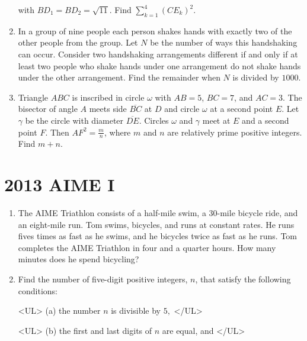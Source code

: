 \documentclass{article}
\begin{document}
\begin{enumerate}[label=\arabic*., itemsep=0.5em]
with $BD_1 = BD_2 = \sqrt{11}$. Find $\sum_{k=1}^4(CE_k)^2$.\par \vspace{0.5em}\item In a group of nine people each person shakes hands with exactly two of the other people from the group. Let $N$ be the number of ways this handshaking can occur. Consider two handshaking arrangements different if and only if at least two people who shake hands under one arrangement do not shake hands under the other arrangement. Find the remainder when $N$ is divided by $1000$.\par \vspace{0.5em}\item Triangle $ABC$ is inscribed in circle $\omega$ with $AB=5$, $BC=7$, and $AC=3$. The bisector of angle $A$ meets side $\overline{BC}$ at $D$ and circle $\omega$ at a second point $E$. Let $\gamma$ be the circle with diameter $\overline{DE}$. Circles $\omega$ and $\gamma$ meet at $E$ and a second point $F$. Then $AF^2 = \frac mn$, where $m$ and $n$ are relatively prime positive integers. Find $m+n$.\par \vspace{0.5em}\end{enumerate}\newpage\section*{2013 AIME I}\begin{enumerate}[label=\arabic*., itemsep=0.5em]\item The AIME Triathlon consists of a half-mile swim, a 30-mile bicycle ride, and an eight-mile run. Tom swims, bicycles, and runs at constant rates. He runs fives times as fast as he swims, and he bicycles twice as fast as he runs. Tom completes the AIME Triathlon in four and a quarter hours. How many minutes does he spend bicycling?\par \vspace{0.5em}\item Find the number of five-digit positive integers, $n$, that satisfy the following conditions:

<UL>
(a) the number $n$ is divisible by $5,$
</UL>

<UL>
(b) the first and last digits of $n$ are equal, and
</UL>


\end{enumerate}
\end{document}
